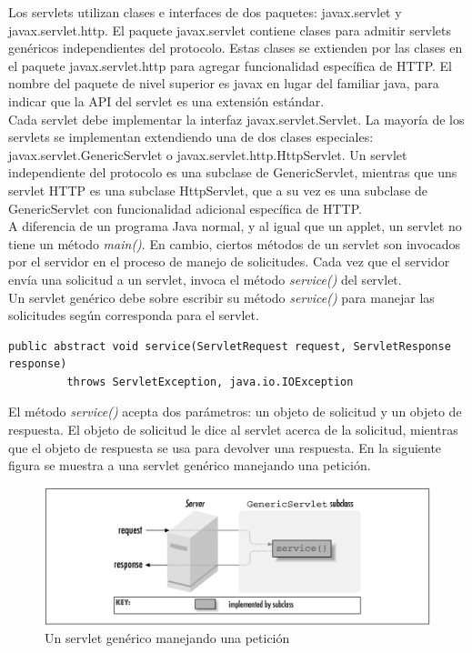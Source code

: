 \documentclass[a4paper,12pt]{article}
\begin{document}
\begin{enumerate}
 Los servlets utilizan clases e interfaces de dos paquetes: javax.servlet y javax.servlet.http. El paquete javax.servlet contiene clases para admitir servlets genéricos independientes
 del protocolo. Estas clases se extienden por las clases en el paquete javax.servlet.http para agregar funcionalidad específica de HTTP. El nombre del paquete de nivel
 superior es javax en lugar del familiar java, para indicar que la API del servlet es una extensión estándar.  \\
 Cada servlet debe implementar la interfaz javax.servlet.Servlet. La mayoría de los servlets se implementan extendiendo una de dos clases especiales:
 javax.servlet.GenericServlet o javax.servlet.http.HttpServlet. Un servlet independiente del protocolo es una subclase de GenericServlet, mientras que uns servlet HTTP
 es una subclase HttpServlet, que a su vez es una subclase de GenericServlet con funcionalidad adicional específica de HTTP. \\
 A diferencia de un programa Java normal, y al igual que un applet, un servlet no tiene un método \textit{main()}. En cambio, ciertos métodos de un servlet son invocados
 por el servidor en el proceso de manejo de solicitudes. Cada vez que el servidor envía una solicitud a un servlet, invoca el método \textit{service()} del servlet. \\
 Un servlet genérico debe sobre escribir su método \textit{service()} para manejar las solicitudes según corresponda para el servlet.
 
 \begin{lstlisting}
public abstract void service(ServletRequest request, ServletResponse response)
         throws ServletException, java.io.IOException
 \end{lstlisting}

 
 El método \textit{service()} acepta dos parámetros: un objeto de solicitud y un objeto de respuesta. 
 El objeto de solicitud le dice al servlet acerca de la solicitud, mientras que el objeto de respuesta se usa para devolver una respuesta.
 En la siguiente figura se muestra a una servlet genérico manejando una petición.
 
 \begin{figure}[H]
  \centering
  \includegraphics[scale = 0.7]{1.png}
  \caption{Un servlet genérico manejando una petición}
 \end{figure}


\end{enumerate}
\end{document}
